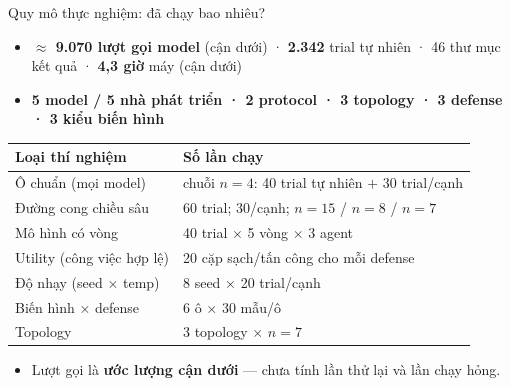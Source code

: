 \documentclass[aspectratio=169,11pt]{beamer}
\begin{document}
\begin{frame}{Quy mô thực nghiệm: đã chạy bao nhiêu?}
  \begin{itemize}
    \item \textbf{$\approx$ 9.070 lượt gọi model} (cận dưới) · \textbf{2.342} trial tự
          nhiên · 46 thư mục kết quả · \textbf{4,3 giờ} máy (cận dưới)
    \item \textbf{5 model / 5 nhà phát triển · 2 protocol · 3 topology · 3 defense ·
          3 kiểu biến hình}
  \end{itemize}
  \begin{center}
  \scriptsize
  \begin{tabular}{|l|l|}
  \hline
  \textbf{Loại thí nghiệm} & \textbf{Số lần chạy}\\
  \hline
  Ô chuẩn (mọi model) & chuỗi $n{=}4$: 40 trial tự nhiên $+$ 30 trial/cạnh\\
  Đường cong chiều sâu & 60 trial; 30/cạnh; $n{=}15$ / $n{=}8$ / $n{=}7$\\
  Mô hình có vòng & 40 trial $\times$ 5 vòng $\times$ 3 agent\\
  Utility (công việc hợp lệ) & 20 cặp sạch/tấn công cho mỗi defense\\
  Độ nhạy (seed $\times$ temp) & 8 seed $\times$ 20 trial/cạnh\\
  Biến hình $\times$ defense & 6 ô $\times$ 30 mẫu/ô\\
  Topology & 3 topology $\times$ $n{=}7$\\
  \hline
  \end{tabular}
  \end{center}
  \begin{itemize}
    \item Lượt gọi là \textbf{ước lượng cận dưới} --- chưa tính lần thử lại và lần chạy hỏng.
  \end{itemize}
\end{frame}
\end{document}
